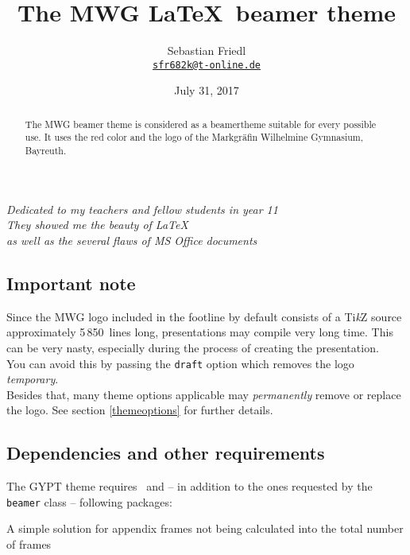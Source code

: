 \documentclass[11pt]{ltxdoc}
\title{The MWG \LaTeX\ beamer theme}
\author{Sebastian Friedl \\ \href{mailto:sfr682k@t-online.de}{\texttt{sfr682k@t-online.de}}}
\date{July 31, 2017}
\begin{document}
	\maketitle
	\thispagestyle{empty}
	

	\begin{center} \itshape
		Dedicated to my teachers and fellow students in year 11 \\[1.25\smallskipamount]
		They showed me the beauty of \LaTeX \\
		as well as the several flaws of MS Office documents
	\end{center}
	
	\medskip
	\begin{abstract}
		\hspace{-1.5em}%
		The MWG beamer theme is considered as a beamertheme suitable for every possible use. It uses the red color and the logo of the Markgräfin Wilhelmine Gymnasium, Bayreuth.
	\end{abstract}
	

	\tableofcontents

	\clearpage
	
	\subsection*{Important note}
	Since the MWG logo included in the footline by default consists of a Ti\textit{k}Z source approximately 5\,850~lines long, presentations may compile very long time. This can be very nasty, especially during the process of creating the presentation. \\
	You can avoid this by passing the \texttt{draft} option which removes the logo \emph{temporary}. \\
	Besides that, many theme options applicable may \emph{permanently} remove or replace the logo. See section \ref{themeoptions} for further details.
	
	
	\subsection*{Dependencies and other requirements}
	The GYPT theme requires \LaTeXe\ and -- in addition to the ones requested by the \texttt{beamer} class -- following packages:
	
	\medskip
	A simple solution for appendix frames not being calculated into the total number of frames
	
\end{document}
